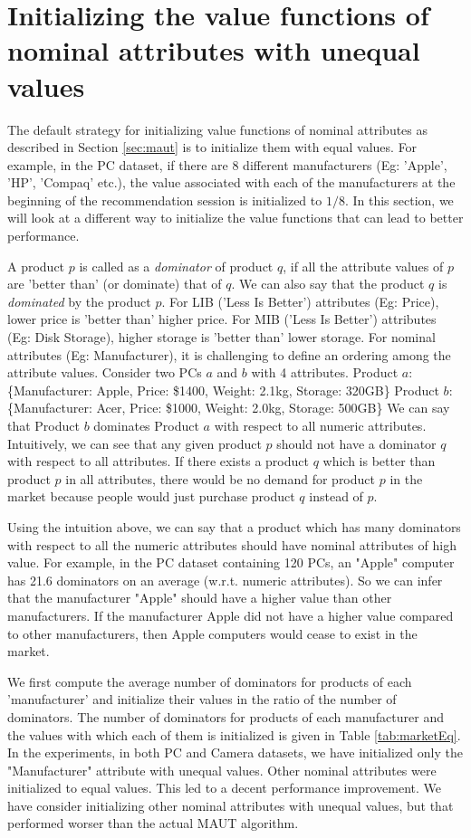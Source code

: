 \section{Initializing the value functions of nominal attributes with unequal values}
The default strategy for initializing value functions of nominal attributes as described in Section \ref{sec:maut} is to initialize them with equal values. 
For example, in the PC dataset, if there are 8 different manufacturers (Eg: 'Apple', 'HP', 'Compaq' etc.), the value associated with each of the manufacturers at the beginning of the recommendation session is initialized to $1/8$.
In this section, we will look at a different way to initialize the value functions that can lead to better performance.

A product $p$ is called as a \textit{dominator} of product $q$, if all the attribute values of  $p$ are 'better than' (or dominate) that of $q$. 
We can also say that the product $q$ is \textit{dominated} by the product $p$.
For LIB ('Less Is Better') attributes (Eg: Price), lower price is 'better than' higher price.
For MIB ('Less Is Better') attributes (Eg: Disk Storage), higher storage is 'better than' lower storage.
For nominal attributes (Eg: Manufacturer), it is challenging to define an ordering among the attribute values.
Consider two PCs $a$ and $b$ with 4 attributes.
Product $a$: \{Manufacturer: Apple, Price: \$1400, Weight: 2.1kg, Storage: 320GB\}
Product $b$: \{Manufacturer: Acer, Price: \$1000, Weight: 2.0kg, Storage: 500GB\}
We can say that Product $b$ dominates Product $a$ with respect to all numeric attributes.
Intuitively, we can see that any given product $p$ should not have a dominator $q$ with respect to all attributes.
If there exists a product $q$ which is better than product $p$ in all attributes, there would be no demand for product $p$ in the market because people would just purchase product $q$ instead of $p$.

Using the intuition above, we can say that a product which has many dominators with respect to all the numeric attributes should have nominal attributes of high value.
For example, in the PC dataset containing 120 PCs, an "Apple" computer has 21.6 dominators on an average (w.r.t. numeric attributes).
So we can infer that the manufacturer "Apple" should have a higher value than other manufacturers. 
If the manufacturer Apple did not have a higher value compared to other manufacturers, then Apple computers would cease to exist in the market.

We first compute the average number of dominators for products of each 'manufacturer' and initialize their values in the ratio of the number of dominators.
The number of dominators for products of each manufacturer and the values with which each of them is initialized is given in Table \ref{tab:marketEq}.
In the experiments, in both PC and Camera datasets, we have initialized only the "Manufacturer" attribute with unequal values. Other nominal attributes were initialized to equal values. This led to a decent performance improvement.
We have consider initializing other nominal attributes with unequal values, but that performed worser than the actual MAUT algorithm.


